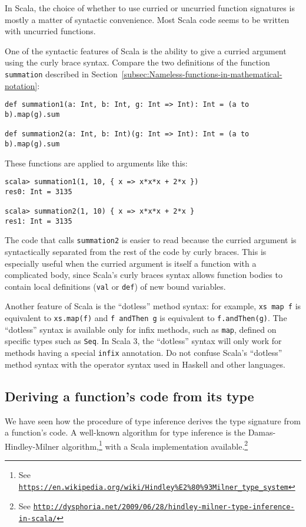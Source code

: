 In Scala, the choice of whether to use curried or uncurried function
signatures is mostly a matter of syntactic convenience. Most Scala
code seems to be written with uncurried functions.

One of the syntactic features of Scala is the ability to give a curried
argument using the curly brace syntax. Compare the two definitions
of the function \lstinline!summation! described in Section~\ref{subsec:Nameless-functions-in-mathematical-notation}:
\begin{lstlisting}
def summation1(a: Int, b: Int, g: Int => Int): Int = (a to b).map(g).sum

def summation2(a: Int, b: Int)(g: Int => Int): Int = (a to b).map(g).sum
\end{lstlisting}
These functions are applied to arguments like this:
\begin{lstlisting}
scala> summation1(1, 10, { x => x*x*x + 2*x })
res0: Int = 3135

scala> summation2(1, 10) { x => x*x*x + 2*x }
res1: Int = 3135
\end{lstlisting}
The code that calls \lstinline!summation2! is easier to read because
the curried argument is syntactically separated from the rest of the
code by curly braces. This is especially useful when the curried argument
is itself a function with a complicated body, since Scala\textsf{'}s curly
braces syntax allows function bodies to contain local definitions
(\lstinline!val! or \lstinline!def!) of new bound variables.

Another feature of Scala is the \textsf{``}dotless\textsf{''} method syntax: for example,
\lstinline!xs map f! is equivalent to \lstinline!xs.map(f)! and
\lstinline!f andThen g! is equivalent to \lstinline!f.andThen(g)!.
The \textsf{``}dotless\textsf{''} syntax is available only for infix methods, such
as \lstinline!map!, defined on specific types such as \lstinline!Seq!.
In Scala 3, the \textsf{``}dotless\textsf{''} syntax will only work for methods having
a special \lstinline!infix! annotation. Do not confuse Scala\textsf{'}s \textsf{``}dotless\textsf{''}
method syntax with the operator syntax used in Haskell and other languages.

\subsection{Deriving a function\textsf{'}s code from its type\label{subsec:Deriving-a-function-s-code}}

We have seen how the procedure of type inference
derives the type signature from a function\textsf{'}s code. A well-known algorithm
for type inference is the Damas-Hindley-Milner algorithm,\footnote{See \texttt{\href{https://en.wikipedia.org/wiki/Hindley\%E2\%80\%93Milner_type_system}{https://en.wikipedia.org/wiki/Hindley\%E2\%80\%93Milner\_type\_system}}}
with a Scala implementation available.\footnote{See \texttt{\href{http://dysphoria.net/2009/06/28/hindley-milner-type-inference-in-scala/}{http://dysphoria.net/2009/06/28/hindley-milner-type-inference-in-scala/}}}


